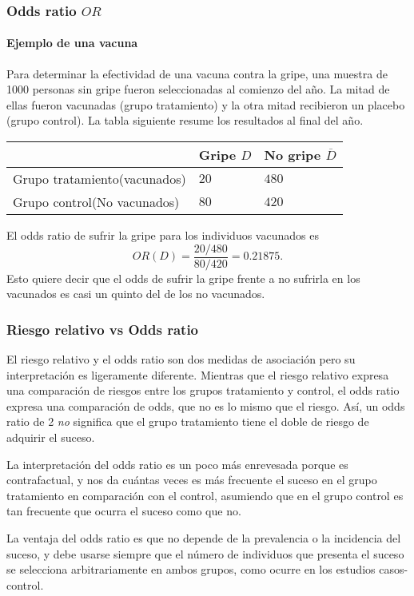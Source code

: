 \begin{frame}
\frametitle{Odds ratio $OR$}
\framesubtitle{Ejemplo de una vacuna}
Para determinar la efectividad de una vacuna contra la gripe, una muestra de 1000 personas sin gripe fueron seleccionadas al comienzo del año. 
La mitad de ellas fueron vacunadas (grupo tratamiento) y la otra mitad recibieron un placebo (grupo control).
La tabla siguiente resume los resultados al final del año.

\begin{center}
  \begin{tabular}{|m{3cm}|m{1.8cm}<{\centering}|m{1.8cm}<{\centering}|}
  \cline{2-3}
  \multicolumn{1}{c|}{} & Gripe $D$ & No gripe $\overline D$\\ 
  \hline
  Grupo tratamiento\newline (vacunados) & $20$ & $480$\\ 
  \hline 
  Grupo control\newline (No vacunados) & $80$ & $420$\\ 
  \hline
\end{tabular}
\end{center}

El odds ratio de sufrir la gripe para los individuos vacunados es
\[
  OR(D) = \frac{20/480}{80/420} = 0.21875.
\]
Esto quiere decir que el odds de sufrir la gripe frente a no sufrirla en los vacunados es casi un quinto del de los no vacunados.
\end{frame}


\begin{frame}
\frametitle{Riesgo relativo vs Odds ratio} 
El riesgo relativo y el odds ratio son dos medidas de asociación pero su interpretación es ligeramente diferente. 
Mientras que el riesgo relativo expresa una comparación de riesgos entre los grupos tratamiento y control, el odds ratio expresa una comparación de odds, que no es lo mismo que el riesgo.
Así, un odds ratio de 2 \emph{no} significa que el grupo tratamiento tiene el doble de riesgo de adquirir el suceso.

La interpretación del odds ratio es un poco más enrevesada porque es contrafactual, y nos da cuántas veces es más frecuente el suceso en el grupo tratamiento en comparación con el control, asumiendo que en el grupo control es tan frecuente que ocurra el suceso como que no.  

La ventaja del odds ratio es que no depende de la prevalencia o la incidencia del suceso, y debe usarse siempre que el número de individuos que presenta el suceso se selecciona arbitrariamente en ambos grupos, como ocurre en los estudios casos-control.
\end{frame}


